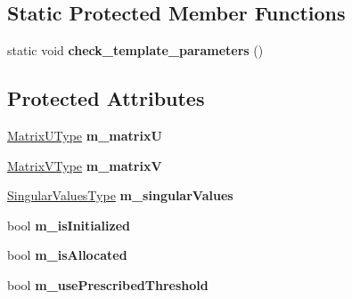 \subsection*{Static Protected Member Functions}
\begin{DoxyCompactItemize}
\item 
\mbox{\label{class_eigen_1_1_s_v_d_base_aec918dd80eeb2d5bf628f15cda83053f}} 
static void {\bfseries check\+\_\+template\+\_\+parameters} ()
\end{DoxyCompactItemize}
\subsection*{Protected Attributes}
\begin{DoxyCompactItemize}
\item 
\mbox{\label{class_eigen_1_1_s_v_d_base_af0e0b3833c1d49286c0fdcbc023c3bd8}} 
\mbox{\hyperlink{class_eigen_1_1_matrix}{Matrix\+U\+Type}} {\bfseries m\+\_\+matrixU}
\item 
\mbox{\label{class_eigen_1_1_s_v_d_base_a69cf1cfb527ff5562156c13bdca45ca5}} 
\mbox{\hyperlink{class_eigen_1_1_matrix}{Matrix\+V\+Type}} {\bfseries m\+\_\+matrixV}
\item 
\mbox{\label{class_eigen_1_1_s_v_d_base_ab71e31e61c33f68ff2f499ed9f30e718}} 
\mbox{\hyperlink{struct_eigen_1_1internal_1_1true__type}{Singular\+Values\+Type}} {\bfseries m\+\_\+singular\+Values}
\item 
\mbox{\label{class_eigen_1_1_s_v_d_base_a633b92f4eb9c65911b943b93bb8b341c}} 
bool {\bfseries m\+\_\+is\+Initialized}
\item 
\mbox{\label{class_eigen_1_1_s_v_d_base_af91d9b16ff9b51e22bfb9b637ef50cfb}} 
bool {\bfseries m\+\_\+is\+Allocated}
\item 
\mbox{\label{class_eigen_1_1_s_v_d_base_a1dd5193fac24ae397f08cc722f3ae3ca}} 
bool {\bfseries m\+\_\+use\+Prescribed\+Threshold}
\item 
\mbox{\label{class_eigen_1_1_s_v_d_base_ad6f49fd8f826a41109f8eb68e2f48dc4}} 

\end{DoxyCompactItemize}
